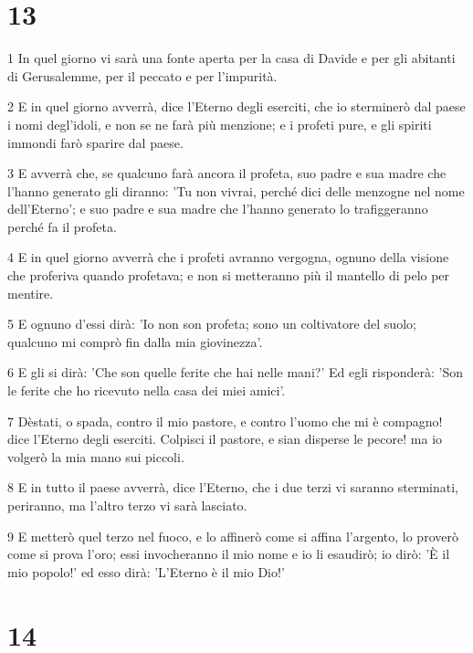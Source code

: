 \chapter{13}

\par 1 In quel giorno vi sarà una fonte aperta per la casa di Davide e per gli abitanti di Gerusalemme, per il peccato e per l'impurità.
\par 2 E in quel giorno avverrà, dice l'Eterno degli eserciti, che io sterminerò dal paese i nomi degl'idoli, e non se ne farà più menzione; e i profeti pure, e gli spiriti immondi farò sparire dal paese.
\par 3 E avverrà che, se qualcuno farà ancora il profeta, suo padre e sua madre che l'hanno generato gli diranno: 'Tu non vivrai, perché dici delle menzogne nel nome dell'Eterno'; e suo padre e sua madre che l'hanno generato lo trafiggeranno perché fa il profeta.
\par 4 E in quel giorno avverrà che i profeti avranno vergogna, ognuno della visione che proferiva quando profetava; e non si metteranno più il mantello di pelo per mentire.
\par 5 E ognuno d'essi dirà: 'Io non son profeta; sono un coltivatore del suolo; qualcuno mi comprò fin dalla mia giovinezza'.
\par 6 E gli si dirà: 'Che son quelle ferite che hai nelle mani?' Ed egli risponderà: 'Son le ferite che ho ricevuto nella casa dei miei amici'.
\par 7 Dèstati, o spada, contro il mio pastore, e contro l'uomo che mi è compagno! dice l'Eterno degli eserciti. Colpisci il pastore, e sian disperse le pecore! ma io volgerò la mia mano sui piccoli.
\par 8 E in tutto il paese avverrà, dice l'Eterno, che i due terzi vi saranno sterminati, periranno, ma l'altro terzo vi sarà lasciato.
\par 9 E metterò quel terzo nel fuoco, e lo affinerò come si affina l'argento, lo proverò come si prova l'oro; essi invocheranno il mio nome e io li esaudirò; io dirò: 'È il mio popolo!' ed esso dirà: 'L'Eterno è il mio Dio!'

\chapter{14}

